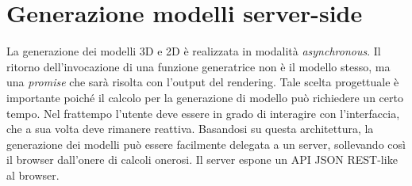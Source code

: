 \section{Generazione modelli server-side}
\label{sec:chapter_3_section_4}

\noindent
La generazione dei modelli 3D e 2D è realizzata in modalità \emph{asynchronous}.
Il ritorno dell'invocazione di una funzione generatrice non \`e il modello stesso,
ma una \emph{promise} che sarà risolta con l'output del rendering. Tale scelta progettuale \`e importante poich\'e il calcolo per la
generazione di modello pu\`o richiedere un certo tempo.
Nel frattempo l'utente deve essere in grado di interagire con l'interfaccia, che a sua volta deve rimanere reattiva.
Basandosi su questa architettura, la generazione dei modelli può essere facilmente delegata a un server,
sollevando così il browser dall'onere di calcoli onerosi. Il server espone un API JSON REST-like al browser.


\newpage


